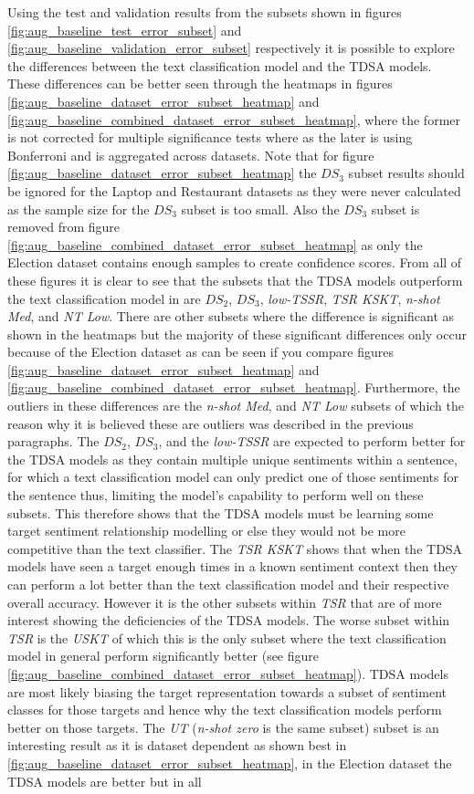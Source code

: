 Using the test and validation results from the subsets shown in figures \ref{fig:aug_baseline_test_error_subset} and \ref{fig:aug_baseline_validation_error_subset} respectively it is possible to explore the differences between the text classification model and the TDSA models. These differences can be better seen through the heatmaps in figures \ref{fig:aug_baseline_dataset_error_subset_heatmap} and \ref{fig:aug_baseline_combined_dataset_error_subset_heatmap}, where the former is not corrected for multiple significance tests where as the later is using Bonferroni and is aggregated across datasets. Note that for figure \ref{fig:aug_baseline_dataset_error_subset_heatmap} the $DS_3$ subset results should be ignored for the Laptop and Restaurant datasets as they were never calculated as the sample size for the $DS_3$ subset is too small. Also the $DS_3$ subset is removed from figure \ref{fig:aug_baseline_combined_dataset_error_subset_heatmap} as only the Election dataset contains enough samples to create confidence scores. From all of these figures it is clear to see that the subsets that the TDSA models outperform the text classification model in are $DS_2$, $DS_3$, \textit{low-TSSR}, \textit{TSR KSKT}, \textit{n-shot Med}, and \textit{NT Low}. There are other subsets where the difference is significant as shown in the heatmaps but the majority of these significant differences only occur because of the Election dataset as can be seen if you compare figures \ref{fig:aug_baseline_dataset_error_subset_heatmap} and \ref{fig:aug_baseline_combined_dataset_error_subset_heatmap}. Furthermore, the outliers in these differences are the \textit{n-shot Med}, and \textit{NT Low} subsets of which the reason why it is believed these are outliers was described in the previous paragraphs. The $DS_2$, $DS_3$, and the \textit{low-TSSR} are expected to perform better for the TDSA models as they contain multiple unique sentiments within a sentence, for which a text classification model can only predict one of those sentiments for the sentence thus, limiting the model's capability to perform well on these subsets. This therefore shows that the TDSA models must be learning some target sentiment relationship modelling or else they would not be more competitive than the text classifier. The \textit{TSR KSKT} shows that when the TDSA models have seen a target enough times in a known sentiment context then they can perform a lot better than the text classification model and their respective overall accuracy. However it is the other subsets within \textit{TSR} that are of more interest showing the deficiencies of the TDSA models. The worse subset within \textit{TSR} is the \textit{USKT} of which this is the only subset where the text classification model in general perform significantly better (see figure \ref{fig:aug_baseline_combined_dataset_error_subset_heatmap}). TDSA models are most likely biasing the target representation towards a subset of sentiment classes for those targets and hence why the text classification models perform better on those targets. The \textit{UT} (\textit{n-shot zero} is the same subset) subset is an interesting result as it is dataset dependent as shown best in \ref{fig:aug_baseline_dataset_error_subset_heatmap}, in the Election dataset the TDSA models are better but in all 